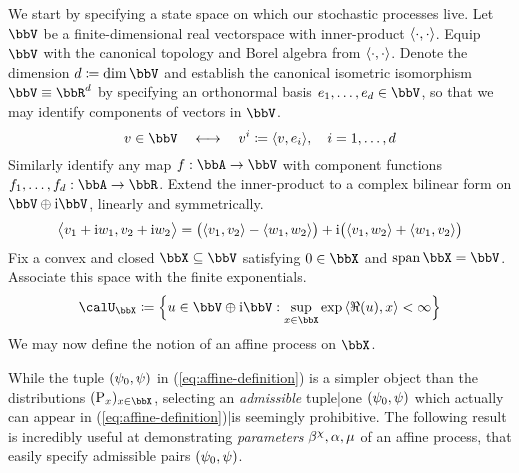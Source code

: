 We start by specifying a state space on which our stochastic processes live.
Let $\vecSpace$ be a finite-dimensional real vectorspace with inner-product ${\langle \cdot , \cdot \rangle}$.
Equip $\vecSpace$ with the canonical topology and Borel algebra from ${\langle \cdot , \cdot \rangle}$.
Denote the dimension $d \defeq \dim\vecSpace$ and establish the canonical isometric isomorphism $\vecSpace \equiv \bbR^d$ by specifying an orthonormal basis $\basisVec_1, \ldots, \basisVec_d \in \vecSpace$, so that we may identify components of vectors in $\vecSpace$.
\begin{equation}
  \vecVar \in \vecSpace \quad\longleftrightarrow\quad \vecVar^i \defeq \prj{\vecVar}{\basisVec_i}, \quad i = 1, \ldots, d
\end{equation}
Similarly identify any map $f: \bbA \rightarrow \vecSpace$ with component functions $f_1,\ldots,f_d: \bbA \rightarrow \bbR$.
Extend the inner-product to a complex bilinear form on $\vecSpace\oplus\im\vecSpace$, linearly and symmetrically.
\begin{equation}
  {\big\langle v_1+{\rm i}w_1 , v_2 + {\rm i}w_2 \big\rangle} = \big({\langle v_1 , v_2 \rangle} - {\langle w_1 , w_2 \rangle}\big) + {\rm i}\big({\langle v_1 , w_2 \rangle} + {\langle w_1 , v_2 \rangle}\big)
\end{equation}
Fix a convex and closed $\stateSpace \subseteq \vecSpace$ satisfying $0 \in \stateSpace$ and $\operatorname{span}\stateSpace = \vecSpace$.
Associate this space with the finite exponentials.
\begin{equation}
  \boundedSpace \defeq \Big\{ \momentVar \in \vecSpace \oplus \im\vecSpace : \sup_{\stateVar \in \stateSpace} \exp\prj{\Re(\momentVar)}{\stateVar} < \infty \Big\}
\end{equation}
We may now define the notion of an affine process on $\stateSpace$.





While the tuple $(\psi_0, \psi)$ in (\ref{eq:affine-definition}) is a simpler object than the distributions $(\Prb_\stateVar)_{\stateVar\in\stateSpace}$, selecting an \emph{admissible} tuple|one $(\psi_0, \psi)$ which actually can appear in (\ref{eq:affine-definition})|is seemingly prohibitive.
The following result is incredibly useful at demonstrating \emph{parameters} $\beta^\chi, \alpha, \mu$ of an affine process, that easily specify admissible pairs $(\psi_0, \psi)$.



